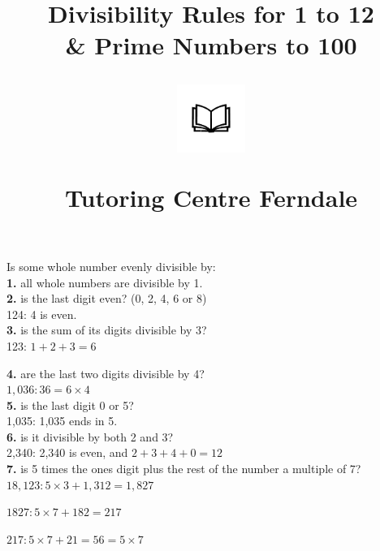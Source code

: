 \documentclass{article}
\title{Divisibility Rules for 1 to 12\\ \& Prime Numbers to 100\\
\begin{center}
\includegraphics[width=3em]{ApS_logo.png}
\end{center}
\begin{normalsize}Tutoring Centre Ferndale \end{normalsize}}
\author{}
\date{}
\begin{document}
\maketitle

Is some whole number evenly divisible by:\\

\textbf{1.} all whole numbers are divisible by 1.\\

\textbf{2.} is the last digit even? (0, 2, 4, 6 or 8)\\

\hspace{2ex}124: 4 is even. \Checkmark\\

\textbf{3.} is the sum of its digits divisible by 3?\\

\hspace{2ex}123: $1+2+3=6$ \Checkmark\\

\newpage

\textbf{4.} are the last two digits divisible by 4?\\

\hspace{2ex}$1,036: 36=6\times4$ \Checkmark\\

\textbf{5.} is the last digit 0 or 5?\\

\hspace{2ex}1,035: 1,035 ends in 5. \Checkmark\\

\textbf{6.} is it divisible by both 2 and 3?\\

\hspace{2ex}2,340: 2,340 is even, and $2+3+4+0=12$ \Checkmark\\

\textbf{7.} is 5 times the ones digit plus the rest of the number a multiple of 7?\\

\hspace{2ex}$18,123: 5 \times 3 + 1,312 = 1,827$

\hspace{4ex}$1827: 5 \times 7 + 182 = 217$

\hspace{5ex}$217: 5 \times 7 + 21 = 56 = 5 \times 7$ \Checkmark\\
\end{document}
